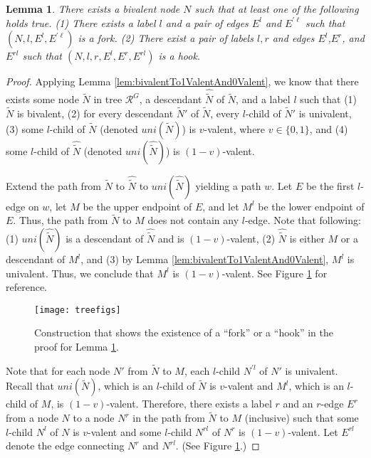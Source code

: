 \documentclass[11pt]{article}
\numberwithin{theorem}{section}
\newtheorem{lemma}[theorem]{Lemma}
\begin{document}
\begin{lemma}\label{lem:hookExists}
 There exists a bivalent node $N$ such that at least one of the following holds true. (1) There exists a label $l$ and a pair of edges $E^l$ and $E^{\prime \ell}$ such that $(N,l,E^l,E^{\prime \ell})$ is a fork. (2) There exist a pair of labels $l,r$ and edges $E^l$,$E^r$, and $E^{rl}$ such that $(N,l,r,E^l,E^r,E^{rl})$ is a hook. 
\end{lemma}
\begin{proof}
 Applying Lemma \ref{lem:bivalentTo1ValentAnd0Valent}, we know that there exists some node $\tilde{N}$ in tree $\mathcal{R}^{G}$, a descendant $\widehat{\tilde{N}}$ of $\tilde{N}$, and a label $l$ such that (1) $\tilde{N}$ is bivalent, (2) for every descendant $\tilde{N}'$ of $\tilde{N}$, every $l$-child of $\tilde{N}'$ is univalent, (3) some $l$-child of $\tilde{N}$ (denoted $uni(\tilde{N})$)
is $v$-valent, where $v \in \{0,1\}$, and (4) some $l$-child of $\widehat{\tilde{N}}$  (denoted $uni(\widehat{\tilde{N}})$)
is $(1-v)$-valent.

Extend the path from $\tilde{N}$ to $\widehat{\tilde{N}}$ to $uni(\widehat{\tilde{N}})$ yielding a path $w$. 
Let $E$ be the first $l$-edge on $w$, let $M$ be the upper endpoint of $E$, and let $M^l$ be the lower endpoint of $E$. Thus, the path from $\tilde{N}$ to $M$ does not contain any $l$-edge.
Note that following:  (1) $uni(\widehat{\tilde{N}})$ is a descendant of $\widehat{\tilde{N}}$ and is $(1-v)$-valent, (2) $\widehat{\tilde{N}}$ is either $M$ or a descendant of $M^l$, and (3) by Lemma \ref{lem:bivalentTo1ValentAnd0Valent}, $M^l$ is univalent. Thus, we conclude that $M^l$ is $(1-v)$-valent. See Figure \ref{fig:hookExistence} for reference.

\begin{figure}[htpb]
 \centering
\texttt{[image: treefigs]}
 \caption{Construction that shows the existence of a ``fork'' or a ``hook'' in the proof for Lemma \ref{lem:hookExists}. }
 \label{fig:hookExistence}
\end{figure}





Note that for each node $N'$ from $\tilde{N}$ to $M$, each $l$-child $N^{\prime l}$ of $N'$ is univalent. 
Recall that $uni(\tilde{N})$, which is an $l$-child of $\tilde{N}$ is $v$-valent and $M^l$, which is an $l$-child of $M$, is $(1-v)$-valent. Therefore, there exists a label $r$ and an $r$-edge $E^r$ from a node $N$ to a node $N^r$ in the path from $\tilde{N}$ to $M$ (inclusive) such that some $l$-child $N^l$ of $N$ is $v$-valent and some $l$-child $N^{rl}$ of $N^r$ is $(1-v)$-valent. Let $E^{rl}$ denote the edge connecting $N^r$ and $N^{rl}$. (See Figure \ref{fig:hookExistence}.)






\end{proof}
\end{document}
